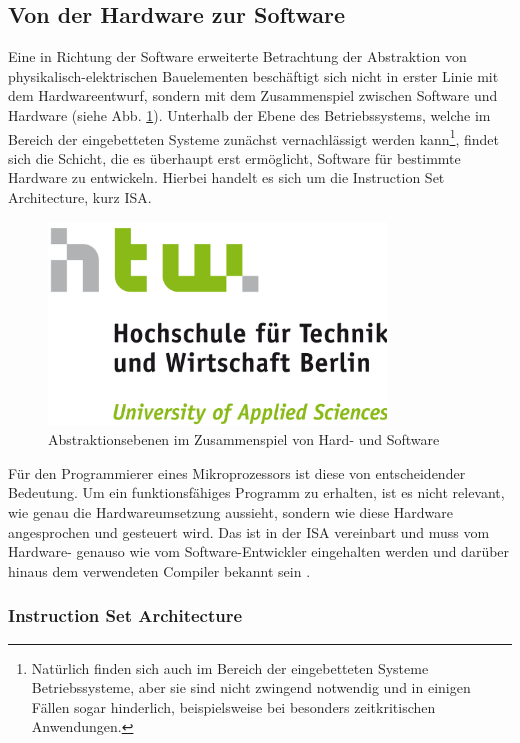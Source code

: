 \documentclass[11pt,a4paper,titlepage]{article}
\begin{document}
\subsection{Von der Hardware zur Software}

Eine in Richtung der Software erweiterte Betrachtung der Abstraktion von physikalisch-elektrischen Bauelementen beschäftigt sich nicht in erster Linie mit dem Hardwareentwurf, sondern mit dem Zusammenspiel zwischen Software und Hardware (siehe Abb. \ref{img:AbstrEbenenSoft}). Unterhalb der Ebene des Betriebssystems, welche im Bereich der eingebetteten Systeme zunächst vernachlässigt werden kann\footnote{Natürlich finden sich auch im Bereich der eingebetteten Systeme Betriebssysteme, aber sie sind nicht zwingend notwendig und in einigen Fällen sogar hinderlich, beispielsweise bei besonders zeitkritischen Anwendungen.}, findet sich die Schicht, die es überhaupt erst ermöglicht, Software für bestimmte Hardware zu entwickeln. Hierbei handelt es sich um die Instruction Set Architecture, kurz ISA.

\begin{figure}[!ht]
	\centering
	\includegraphics[width=0.8\textwidth]{images/htw_hochschule.png}
	\caption{Abstraktionsebenen im Zusammenspiel von Hard- und Software \cite{Bauernoeppel}}
	\label{img:AbstrEbenenSoft}
\end{figure}

Für den Programmierer eines Mikroprozessors ist diese von entscheidender Bedeutung. Um ein funktionsfähiges Programm zu erhalten, ist es nicht relevant, wie genau die Hardwareumsetzung aussieht, sondern wie diese Hardware angesprochen und gesteuert wird. Das ist in der ISA vereinbart und muss vom Hardware- genauso wie vom Software-Entwickler eingehalten werden und darüber hinaus dem verwendeten Compiler bekannt sein \cite[S. 20]{Hennessy2}.

\subsubsection{Instruction Set Architecture}
\end{document}
